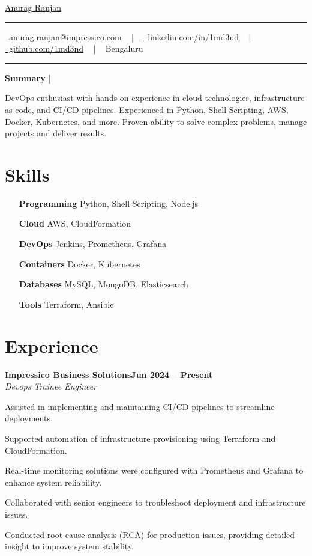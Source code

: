 \documentclass[letterpaper,10pt]{article}
\newcommand{\documentTitle}[2]{
  \begin{center}
    {\Huge\color{accentTitle} #1}
    \vspace{10pt}
    {\color{accentLine} \hrule}
    \vspace{2pt}
    \footnotesize{#2}
    \vspace{2pt}
    {\color{accentLine} \hrule}
  \end{center}
}
\newcommand{\tinysection}[1]{
  \phantomsection
  \addcontentsline{toc}{section}{#1}
  {\large{\bfseries\color{accentText}#1} {\color{accentLine} |}}
}
\newcommand{\heading}[2]{
  \hspace{10pt}#1\hfill#2\\
}
\newcommand{\headingBf}[2]{
  \heading{\textbf{#1}}{\textbf{#2}}
}
\newcommand{\headingIt}[2]{
  \heading{\textit{#1}}{\textit{#2}}
}
\newenvironment{resume_list}{
  \vspace{-7pt}
  \begin{itemize}[itemsep=-2px, parsep=1pt, leftmargin=30pt]
}{
  \end{itemize}
}
\begin{document}
\documentTitle{\href{https://1md3nd.com}{Anurag Ranjan}}{
  \href{mailto:anurag.ranjan@impressico.com}{\raisebox{-0.15\height} 
  \faEnvelope\ anurag.ranjan@impressico.com} ~ | ~
  \href{https://linkedin.com/in/1md3nd}{\raisebox{-0.15\height} \faLinkedin\ linkedin.com/in/1md3nd} ~ | ~
  \href{https://github.com/1md3nd}{\raisebox{-0.15\height} \faGithub\ github.com/1md3nd} ~ | ~
  Bengaluru
}
\tinysection{Summary}
DevOps enthusiast with hands-on experience in cloud technologies, infrastructure as code, and CI/CD pipelines. Experienced in Python, Shell Scripting, AWS, Docker, Kubernetes, and more. Proven ability to solve complex problems, manage projects and deliver results.

\section{Skills}
\begin{multicols}{2}
  \begin{itemize}[itemsep=-2px, parsep=1pt, leftmargin=75pt]
    \item[\textbf{Programming}] Python, Shell Scripting, Node.js
    \item[\textbf{Cloud}] AWS, CloudFormation
    \item[\textbf{DevOps}] Jenkins, Prometheus, Grafana
    \item[\textbf{Containers}] Docker, Kubernetes
    \item[\textbf{Databases}] MySQL, MongoDB, Elasticsearch
    \item[\textbf{Tools}] Terraform, Ansible
  \end{itemize}
\end{multicols}

\section{Experience}

\headingBf{\href {https://www.impressico.com}{Impressico Business Solutions}}{Jun 2024 -- Present}  
\headingIt{Devops Trainee Engineer}{}  
\begin{resume_list}  
  \item Assisted in implementing and maintaining CI/CD pipelines to streamline deployments.  
  \item Supported automation of infrastructure provisioning using Terraform and CloudFormation.  
  \item Real-time monitoring solutions were configured with Prometheus and Grafana to enhance system reliability.  
  \item Collaborated with senior engineers to troubleshoot deployment and infrastructure issues.
  \item Conducted root cause analysis (RCA) for production issues, providing detailed insight to improve system stability.
\end{resume_list}
\end{document}
